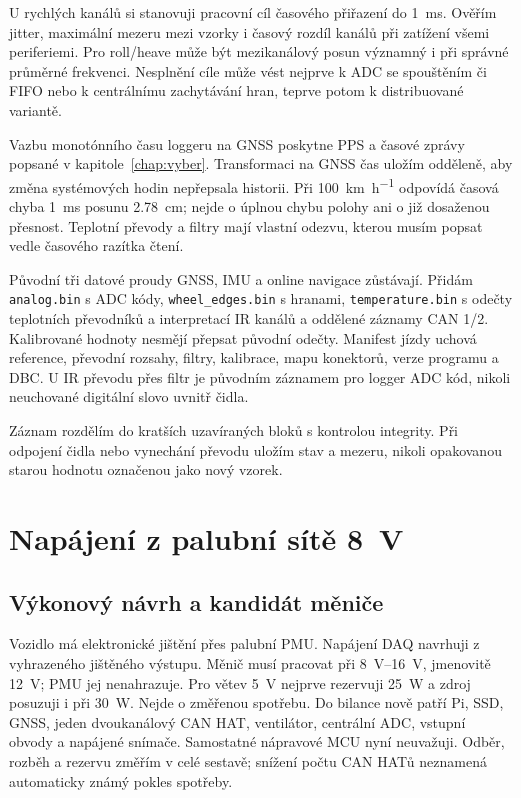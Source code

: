 U rychlých kanálů si stanovuji pracovní cíl časového přiřazení do
\SI{1}{ms}. Ověřím jitter, maximální mezeru mezi vzorky i časový rozdíl
kanálů při zatížení všemi periferiemi. Pro roll/heave může být
mezikanálový posun významný i při správné průměrné frekvenci.
Nesplnění cíle může vést nejprve k ADC se spouštěním či FIFO nebo
k centrálnímu zachytávání hran, teprve potom k distribuované variantě.

Vazbu monotónního času loggeru na GNSS poskytne PPS a časové zprávy
popsané v kapitole~\ref{chap:vyber}. Transformaci na GNSS čas uložím
odděleně, aby změna systémových hodin nepřepsala historii. Při
\SI{100}{km\per\hour} odpovídá časová chyba \SI{1}{ms} posunu
\SI{2.78}{cm}; nejde o úplnou chybu polohy ani o již dosaženou přesnost.
Teplotní převody a filtry mají vlastní odezvu, kterou musím popsat
vedle časového razítka čtení.

Původní tři datové proudy GNSS, IMU a online navigace zůstávají.
Přidám \texttt{analog.bin} s ADC kódy, \texttt{wheel\_edges.bin}
s hranami, \texttt{temperature.bin} s odečty teplotních převodníků
a interpretací IR kanálů a oddělené záznamy CAN 1/2. Kalibrované
hodnoty nesmějí přepsat původní odečty. Manifest jízdy uchová
reference, převodní rozsahy, filtry, kalibrace, mapu konektorů,
verze programu a DBC. U IR převodu přes filtr je původním záznamem
pro logger ADC kód, nikoli neuchované digitální slovo uvnitř čidla.

Záznam rozdělím do kratších uzavíraných bloků s kontrolou integrity.
Při odpojení čidla nebo vynechání převodu uložím stav a mezeru,
nikoli opakovanou starou hodnotu označenou jako nový vzorek.

\section{Napájení z palubní sítě 8~V}
\label{sec:napajeni-vozidlo}

\subsection{Výkonový návrh a kandidát měniče}

Vozidlo má elektronické jištění přes palubní PMU. Napájení DAQ
navrhuji z vyhrazeného jištěného výstupu. Měnič musí pracovat při
\SIrange{8}{16}{V}, jmenovitě \SI{12}{V}; PMU jej nenahrazuje.
Pro větev \SI{5}{V} nejprve rezervuji \SI{25}{W} a zdroj posuzuji
i při \SI{30}{W}. Nejde o změřenou spotřebu. Do bilance nově patří
Pi, SSD, GNSS, jeden dvoukanálový CAN HAT, ventilátor, centrální ADC,
vstupní obvody a napájené snímače. Samostatné nápravové MCU nyní
neuvažuji. Odběr, rozběh a rezervu změřím v celé sestavě; snížení
počtu CAN HATů neznamená automaticky známý pokles spotřeby.

